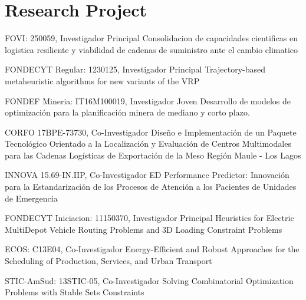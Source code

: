 \section{Research Project}

{FOVI: 250059, Investigador Principal}
{Consolidacion de capacidades cientificas en logistica resiliente y viabilidad de cadenas de suministro ante el cambio climatico}

{FONDECYT Regular: 1230125, Investigador Principal}
{Trajectory-based metaheuristic algorithms for new variants of the VRP}

{FONDEF Mineria: IT16M100019, Investigador Joven}
{Desarrollo de modelos de optimizaci\'on para la planificaci\'on minera de mediano y corto plazo.}

{CORFO 17BPE-73730, Co-Investigador}
{Dise\~no e Implementaci\'on de un Paquete Tecnol\'ogico Orientado a la Localizaci\'on y Evaluaci\'on de Centros Multimodales para las Cadenas Log\'isticas de Exportaci\'on de la Meso Regi\'on Maule - Los Lagos}

{INNOVA 15.69-IN.IIP, Co-Investigador}
{ED Performance Predictor: Innovaci\'on para la Estandarizaci\'on de los Procesos de Atenci\'on a los Pacientes de Unidades de Emergencia}

{FONDECYT Iniciacion: 11150370, Investigador Principal}
{Heuristics for Electric MultiDepot Vehicle Routing Problems and 3D Loading Constraint Problems}

{ECOS: C13E04, Co-Investigador}
{Energy-Efficient and Robust Approaches for the Scheduling of Production, Services, and Urban Transport}

{STIC-AmSud: 13STIC-05, Co-Investigador}
{Solving Combinatorial Optimization Problems with Stable Sets Constraints}

